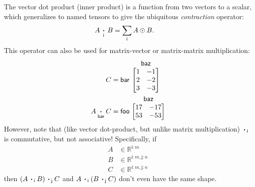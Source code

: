 \documentclass{article}
\makeatletter
\newcommand{\name}[1]{\mathsf{#1}}
\newcommand{\ndot}[1]{\mathbin{\mathop{\thinspace\boldsymbol\cdot\thinspace}\displaylimits_{\name{#1}}}}
\newcommand{\namedmatrix}[3]{%
\ifx #1\end\end \else #1\ \fi
\begin{array}[b]{@{}c@{}} \smash{#2} \\ \begin{bmatrix} #3 \end{bmatrix} \end{array}
}
\makeatother
\begin{document}
The vector dot product (inner product) is a function from two vectors to a scalar, which generalizes to named tensors to give the ubiquitous \emph{contraction} operator:
\begin{align*}
  A \ndot{i} B &= \sum_{\name{i}} A \odot B.
\end{align*}
This operator can also be used for matrix-vector or matrix-matrix multiplication:
\begin{align*}
C &= \namedmatrix{\name{bar}}{\name{baz}}{
  1 & -1 \\ 2 & -2 \\ 3 & -3
} \\
A \ndot{bar} C &= \namedmatrix{\name{foo}}{\name{baz}}{
  17 & -17 \\
  53 & -53
}
\end{align*}
However, note that (like vector dot-product, but unlike matrix multiplication) $\ndot{i}$ is commutative, but not associative! Specifically, if
\begin{align*}
A &\in \mathbb{R}^{\name{i}:m} \\
B &\in \mathbb{R}^{\name{i}:m,\name{j}:n} \\
C &\in \mathbb{R}^{\name{i}:m,\name{j}:n}
\end{align*}
then $(A \ndot{i} B) \ndot{j} C$ and $A \ndot{i} (B \ndot{j} C)$ don't even have the same shape.
\end{document}

